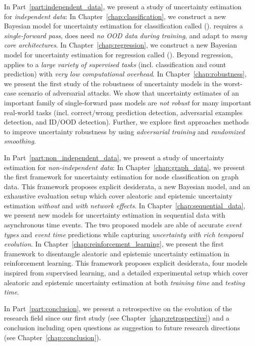 In Part~\ref{part:independent_data}, we present a study of uncertainty estimation for \emph{independent data}: 
In Chapter~\ref{chap:classification}, we construct a new Bayesian model for uncertainty estimation for classification called \PostNet{} (\PostNetacro{}). \PostNetacro{} requires a \emph{single-forward pass}, does need \emph{no OOD data during training}, and adapt to \emph{many core architectures}.
In Chapter~\ref{chap:regression}, we construct a new Bayesian model for uncertainty estimation for regression called \NatPN{} (\NatPNacro{}). Beyond regression, \NatPNacro{} applies to a \emph{large variety of supervised tasks} (incl. classification and count prediction) with \emph{very low computational overhead}.
In Chapter~\ref{chap:robustness}, we present the first study of the robustness of uncertainty models in the worst-case scenario of adversarial attacks. We show that uncertainty estimates of an important family of single-forward pass models are \emph{not robust} for many important real-world tasks (incl. correct/wrong prediction detection, adversarial examples detection, and ID/OOD detection). Further, we explore first approaches methods to improve uncertainty robustness by using \emph{adversarial training} and \emph{randomized smoothing}. 

In Part~\ref{part:non_independent_data}, we present a study of uncertainty estimation for \emph{non-independent data}:
In Chapter~\ref{chap:graph_data}, we present the first framework for uncertainty estimation for node classification on graph data. This framework proposes explicit desiderata, a new Bayesian model, and an exhaustive evaluation setup which cover aleatoric and epistemic uncertainty estimation \emph{without} and \emph{with network effects}.
In Chapter~\ref{chap:sequential_data}, we present new models for uncertainty estimation in sequential data with asynchronous time events. The two proposed models are able of accurate \emph{event types} and \emph{event time} predictions while capturing \emph{uncertainty with rich temporal evolution}.
In Chapter~\ref{chap:reinforcement_learning}, we present the first framework to disentangle aleatoric and epistemic uncertainty estimation in reinforcement learning. This framework proposes explicit desiderata, four models inspired from supervised learning, and a detailed experimental setup which cover aleatoric and epistemic uncertainty estimation at both \emph{training time} and \emph{testing time}.

In Part~\ref{part:conclusion}, we present a retrospective on the evolution of the research field since our first study (see Chapter~\ref{chap:retrospective}) and a conclusion including open questions as suggestion to future research directions (see Chapter~\ref{chap:conclusion}).


